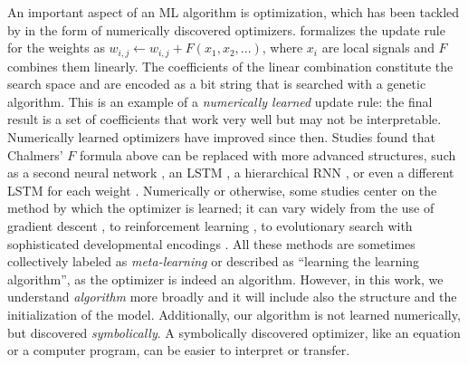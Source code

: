 {An important aspect of an ML algorithm is optimization, which has been tackled by \aml in the form of numerically discovered optimizers.  formalizes the update rule for the weights as \mbox{$w_{i, j} \leftarrow w_{i, j} + F(x_1, x_2, ...)$}, where $x_i$ are local signals and $F$ combines them linearly. The coefficients of the linear combination constitute the search space and are encoded as a bit string that is searched with a genetic algorithm. This is an example of a \textit{numerically learned} update rule: the final result is a set of coefficients that work very well but may not be interpretable. Numerically learned optimizers have improved since then. Studies found that Chalmers' $F$ formula above can be replaced with more advanced structures, such as a second neural network \cite{runarsson2000evolution, orchard2016evolution}, an LSTM \cite{ravi2016optimization}, a hierarchical RNN \cite{wichrowska2017learned}, or even a different LSTM for each weight \cite{metz2019meta}. Numerically or otherwise, some studies center on the method by which the optimizer is learned; it can vary widely from the use of gradient descent \cite{andrychowicz2016learning}, to reinforcement learning \cite{li2017learning}, to evolutionary search with sophisticated developmental encodings \cite{risi2010indirectly}. All these methods are sometimes collectively labeled as \textit{meta-learning} \cite{vanschoren2018meta} or described as ``learning the learning algorithm'', as the optimizer is indeed an algorithm. However, in this work, we understand \textit{algorithm} more broadly and it will include also the structure and the initialization of the model. Additionally, our algorithm is not learned numerically, but discovered \textit{symbolically}. A symbolically discovered optimizer, like an equation or a computer program, can be easier to interpret or transfer.

}
